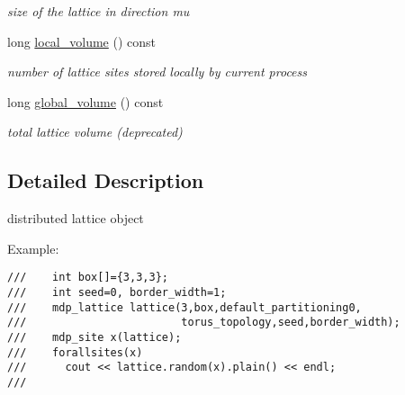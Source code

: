 \begin{CompactItemize}
\begin{CompactList}\small\item\em size of the lattice in direction mu \item\end{CompactList}\item 
\hypertarget{classmdp__lattice_bf640fbe2fb09dcb7f269d7693f60eee}{
long \hyperlink{classmdp__lattice_bf640fbe2fb09dcb7f269d7693f60eee}{local\_\-volume} () const }
\label{classmdp__lattice_bf640fbe2fb09dcb7f269d7693f60eee}

\begin{CompactList}\small\item\em number of lattice sites stored locally by current process \item\end{CompactList}\item 
\hypertarget{classmdp__lattice_4c737d351298f82b26c6a6fbf29b0932}{
long \hyperlink{classmdp__lattice_4c737d351298f82b26c6a6fbf29b0932}{global\_\-volume} () const }
\label{classmdp__lattice_4c737d351298f82b26c6a6fbf29b0932}

\begin{CompactList}\small\item\em total lattice volume (deprecated) \item\end{CompactList}\end{CompactItemize}


\subsection{Detailed Description}
distributed lattice object 

Example: 

\footnotesize\begin{verbatim}
///    int box[]={3,3,3};
///    int seed=0, border_width=1;
///    mdp_lattice lattice(3,box,default_partitioning0,
///                        torus_topology,seed,border_width);
///    mdp_site x(lattice);
///    forallsites(x)
///      cout << lattice.random(x).plain() << endl;
/// \end{verbatim}
\normalsize
 

